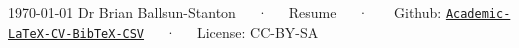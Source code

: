 \documentclass[11pt, a4paper]{awesome-cv}
\begin{document}
\makecvheader[C]

\makecvfooter
  {\today}
  {Dr Brian Ballsun-Stanton~~~·~~~Resume~~~·~~~ Github: \href{https://github.com/Denubis/Academic-LaTeX-CV-BibTeX-CSV}{\tt Academic-\LaTeX{}-CV-BibTeX-CSV}~~~·~~~License: CC-BY-SA}
  {\thepage}








% 
%
%
%
% 

% 
% 
% 
% 
% 





\end{document}
